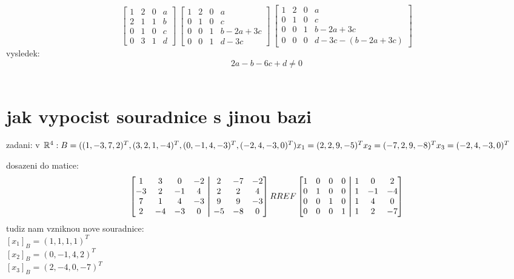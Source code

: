 \documentclass[a4paper]{article}
\newcommand\aug{\fboxsep=-\fboxrule\!\!\!\fbox{\strut}\!\!\!}
\begin{document}
$$
\begin{bmatrix}
    1 & 2 & 0 & a \\
    2 & 1 & 1 & b \\
    0 & 1 & 0 & c \\
    0 & 3 & 1 & d 
\end{bmatrix}
~
\begin{bmatrix}
    1 & 2 & 0 & a \\
    0 & 1 & 0 & c \\
    0 & 0 & 1 & b-2a+3c \\
    0 & 0 & 1 & d-3c 
\end{bmatrix}
~
\begin{bmatrix}
    1 & 2 & 0 & a \\
    0 & 1 & 0 & c \\
    0 & 0 & 1 & b-2a+3c \\
    0 & 0 & 0 & d-3c-(b-2a+3c) 
\end{bmatrix}
$$
vysledek:
$$ 2a - b - 6c + d \neq 0 $$
\\


\section{jak vypocist souradnice s jinou bazi}
zadani: v $\mathbb{R}^4:\\
B=((1,-3,7,2)^T,(3,2,1,-4)^T,(0,-1, 4,-3)^T,(-2, 4, -3, 0)^T)\\
x_1=(2, 2, 9, -5)^T \\
x_2=(-7, 2, 9, -8)^T \\
x_3=(-2, 4, -3, 0)^T \\
$

dosazeni do matice:
$$
\begin{bmatrix}
    1 & 3 & 0 & -2 &\aug& 2&-7 &-2 \\
    -3 & 2 &-1 &4  &\aug& 2&2 &4 \\
    7 & 1 & 4 &-3  &\aug& 9& 9 & -3 \\
    2 & -4& -3 & 0 &\aug& -5& -8 &0
\end{bmatrix}
RREF
\begin{bmatrix}
    1 & 0 & 0 & 0 &\aug& 1 & 0 & 2 \\
    0 & 1 & 0 & 0 &\aug& 1 &-1 &-4 \\
    0 & 0 & 1 & 0 &\aug& 1 & 4 & 0 \\
    0 & 0 & 0 & 1 &\aug& 1 & 2 & -7
\end{bmatrix}
$$
tudiz nam vzniknou nove souradnice:\\
$[x_1]_B = (1, 1, 1, 1)^T  $\\
$[x_2]_B = (0, -1, 4, 2)^T $\\
$[x_3]_B = (2, -4, 0, -7)^T$

\section{}
\end{document}
